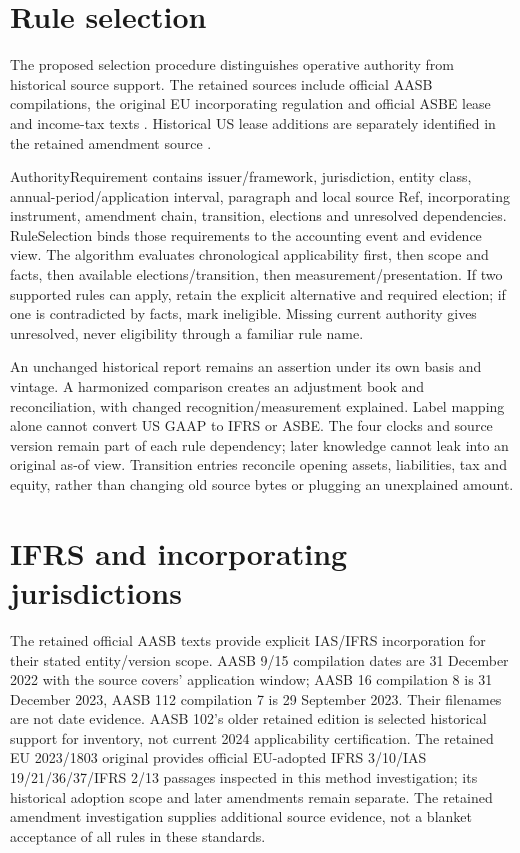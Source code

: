 \hypertarget{rule-selection}{%
\section{Rule selection}\label{method-standards-methods-rule-selection}}

The proposed selection procedure distinguishes operative authority from historical source support. The retained sources include official AASB compilations, the original EU incorporating regulation and official ASBE lease and income-tax texts \citep{aasb9dated,aasb15dated,aasb16dated,aasb112dated,eu20231803,mofasbe21,moflease2018,mofasbe18,mofinterpretation16}. Historical US lease additions are separately identified in the retained amendment source \citep{fasbasu201602}.

AuthorityRequirement contains issuer/framework, jurisdiction, entity class, annual-period/application interval, paragraph and local source Ref, incorporating instrument, amendment chain, transition, elections and unresolved dependencies. RuleSelection binds those requirements to the accounting event and evidence view. The algorithm evaluates chronological applicability first, then scope and facts, then available elections/transition, then measurement/presentation. If two supported rules can apply, retain the explicit alternative and required election; if one is contradicted by facts, mark ineligible. Missing current authority gives unresolved, never eligibility through a familiar rule name.

An unchanged historical report remains an assertion under its own basis and vintage. A harmonized comparison creates an adjustment book and reconciliation, with changed recognition/measurement explained. Label mapping alone cannot convert US GAAP to IFRS or ASBE. The four clocks and source version remain part of each rule dependency; later knowledge cannot leak into an original as-of view. Transition entries reconcile opening assets, liabilities, tax and equity, rather than changing old source bytes or plugging an unexplained amount.

\hypertarget{ifrs-and-incorporating-jurisdictions}{%
\section{IFRS and incorporating jurisdictions}\label{method-standards-methods-ifrs-and-incorporating-jurisdictions}}

The retained official AASB texts provide explicit IAS/IFRS incorporation for their stated entity/version scope. AASB 9/15 compilation dates are 31 December 2022 with the source covers' application window; AASB 16 compilation 8 is 31 December 2023, AASB 112 compilation 7 is 29 September 2023. Their filenames are not date evidence. AASB 102's older retained edition is selected historical support for inventory, not current 2024 applicability certification. The retained EU 2023/1803 original provides official EU-adopted IFRS 3/10/IAS 19/21/36/37/IFRS 2/13 passages inspected in this method investigation; its historical adoption scope and later amendments remain separate. The retained amendment investigation supplies additional source evidence, not a blanket acceptance of all rules in these standards.

